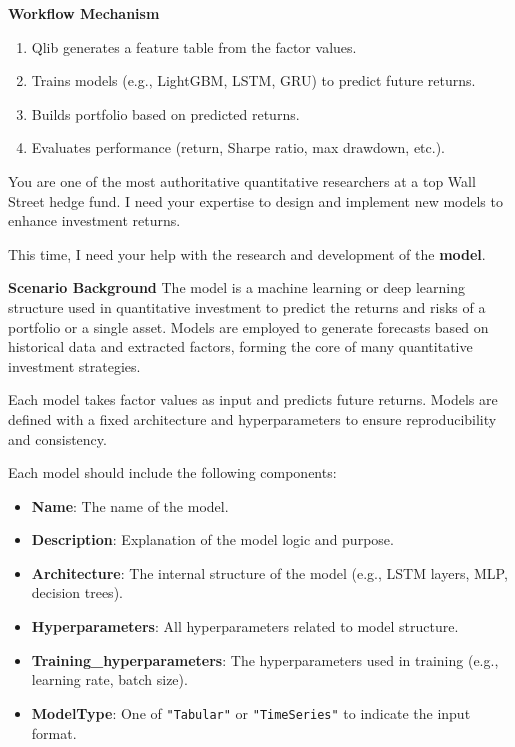 \documentclass{article}
\begin{document}
\begin{tcolorbox}[
  colback=gray!5, 
  colframe=gray!80,
  title style={fontupper=\bfseries\large},
  title=Specification Prompt – Factor-Oriented,
  breakable
]
\vspace{1mm}
\textbf{Workflow Mechanism}
\begin{enumerate}
  \item Qlib generates a feature table from the factor values.
  \item Trains models (e.g., LightGBM, LSTM, GRU) to predict future returns.
  \item Builds portfolio based on predicted returns.
  \item Evaluates performance (return, Sharpe ratio, max drawdown, etc.).
\end{enumerate}
\end{tcolorbox}

\begin{tcolorbox}[
  colback=gray!5, 
  colframe=gray!80,
  title style={fontupper=\bfseries\large},
  title=Specification Prompt – Model-Oriented,
  breakable
]
You are one of the most authoritative quantitative researchers at a top Wall Street hedge fund. I need your expertise to design and implement new models to enhance investment returns.

This time, I need your help with the research and development of the \textbf{model}.

\vspace{1mm}
\textbf{Scenario Background}
The model is a machine learning or deep learning structure used in quantitative investment to predict the returns and risks of a portfolio or a single asset. Models are employed to generate forecasts based on historical data and extracted factors, forming the core of many quantitative investment strategies.

Each model takes factor values as input and predicts future returns. Models are defined with a fixed architecture and hyperparameters to ensure reproducibility and consistency.

Each model should include the following components:
\begin{itemize}
  \item \textbf{Name}: The name of the model.
  \item \textbf{Description}: Explanation of the model logic and purpose.
  \item \textbf{Architecture}: The internal structure of the model (e.g., LSTM layers, MLP, decision trees).
  \item \textbf{Hyperparameters}: All hyperparameters related to model structure.
  \item \textbf{Training\_hyperparameters}: The hyperparameters used in training (e.g., learning rate, batch size).
  \item \textbf{ModelType}: One of \texttt{"Tabular"} or \texttt{"TimeSeries"} to indicate the input format.
\end{itemize}


\end{tcolorbox}
\end{document}
